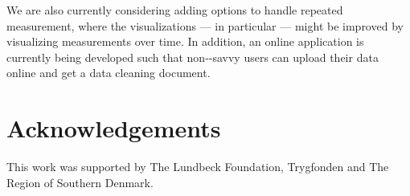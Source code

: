 \documentclass[article,shortnames]{jss}
\begin{document}
We are also currently considering adding options to handle repeated
measurement, where the visualizations --- in particular --- might be
improved by visualizing measurements over time. In addition, an online
 \citep{shiny} application is currently being developed
such that non--savvy users can upload their data online
and get a data cleaning document.


\section*{Acknowledgements}
\label{acknowledgements}
This work was supported by The Lundbeck Foundation, Trygfonden and The Region of Southern Denmark. 



% 



\appendix
\newpage

% 








\end{document}
